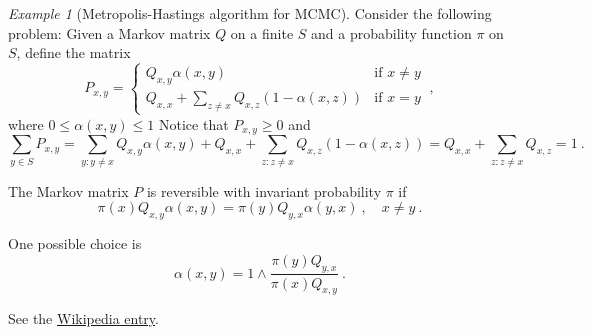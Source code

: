 \documentclass[12pt,a4paper]{amsart}
\theoremstyle{plain}%
\theoremstyle{definition}
\theoremstyle{remark}
\newtheorem{example}{Example}
\begin{document}
\begin{example}[Metropolis-Hastings algorithm for MCMC]
Consider the following problem: Given a Markov matrix $Q$ on a finite $S$ and a probability function $\pi$ on $S$, define the matrix
\begin{equation*}
  P_{x,y} =
  \begin{cases}
    Q_{x,y}\alpha(x,y) & \text{if $x \neq y$} \\
    Q_{x,x} + \sum_{z \neq x} Q_{x,z}(1 - \alpha(x,z)) & \text{if $x=y$}
  \end{cases} \ ,
\end{equation*}
where $0 \leq \alpha(x,y) \leq 1$
Notice that $P_{x,y} \ge 0$ and 
\begin{equation*}
  \sum_{y \in S} P_{x,y} = \sum_{y \colon y \neq x} Q_{x,y}\alpha(x,y) + Q_{x,x} + \sum_{z \colon z \neq x} Q_{x,z}(1 - \alpha(x,z))  = Q_{x,x} + \sum_{z \colon z \neq x} Q_{x,z} = 1 \ .
\end{equation*}

The Markov matrix $P$ is reversible with invariant probability $\pi$ if
\begin{equation*}
  \pi(x) Q_{x,y} \alpha(x,y) = \pi(y) Q_{y,x} \alpha(y,x) \ , \quad x \neq y \ . 
\end{equation*}

One possible choice is
\begin{equation*}
  \alpha(x,y) = 1 \wedge \frac{\pi(y)Q_{y,x}}{\pi(x)Q_{x,y}} \ .
\end{equation*}

See the \href{https://en.wikipedia.org/wiki/Metropolis-Hastings_algorithm}{Wikipedia entry}.
\end{example}

%

\end{document}
